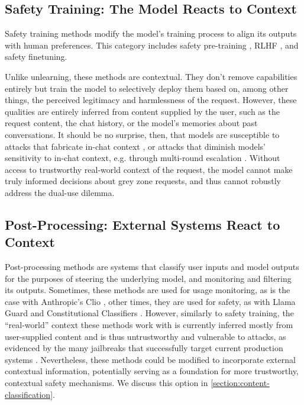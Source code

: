\documentclass{article}
\theoremstyle{plain}
\theoremstyle{definition}
\theoremstyle{remark}
\begin{document}
\subsection{Safety Training: The Model Reacts to Context}

Safety training methods modify the model's training process to align
its outputs with human preferences.
This category includes safety pre-training \cite{maini2025safetypretraininggenerationsafe}, RLHF \cite{christiano2023deepreinforcementlearninghuman}, and safety finetuning.

Unlike unlearning, these methods are contextual.
They don't remove capabilities entirely but train the model to selectively deploy them based on, among other things, the perceived legitimacy and harmlessness of the request.
However, these qualities are entirely inferred from content supplied by the user, such as the request content, the chat history, or the model's memories about past conversations.
It should be no surprise, then, that models are susceptible to attacks that fabricate in-chat context \cite{zeng2024johnnypersuadellmsjailbreak}, or attacks that diminish models' sensitivity to in-chat context, e.g. through multi-round escalation \cite{russinovich2025greatwritearticlethat}.
Without access to trustworthy real-world context of the request, the model cannot make truly informed decisions about grey zone requests, and thus cannot robustly address the dual-use dilemma.

\subsection{Post-Processing: External Systems React to Context} \label{section:post-processing}

Post-processing methods are systems that classify user inputs and model outputs for the purposes of steering the underlying model, and monitoring and filtering its outputs.
Sometimes, these methods are used for usage monitoring, as is the case with Anthropic's Clio \cite{tamkin2024clioprivacypreservinginsightsrealworld, handa2025economictasksperformedai}, other times, they are used for safety, as with Llama Guard \cite{inan2023llamaguardllmbasedinputoutput} and Constitutional Classifiers \cite{sharma2025constitutionalclassifiersdefendinguniversal}.
However, similarly to safety training, the ``real-world'' context these methods work with is currently inferred mostly from user-supplied content and is thus untrustworthy and vulnerable to attacks, as evidenced by the many jailbreaks that successfully target current production systems \cite{zhang2025outputconstraintsattacksurface}.
Nevertheless, these methods could be modified to incorporate external contextual information, potentially serving as a foundation for more trustworthy, contextual safety mechanisms. We discuss this option in \cref{section:content-classification}.
\end{document}
